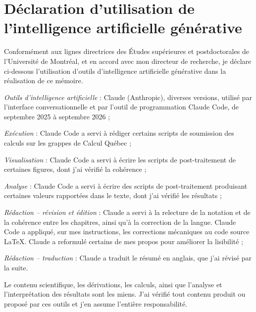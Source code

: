 \chapter{Déclaration d'utilisation de l'intelligence artificielle générative}
\label{chap:annexe-ia}

Conformément aux lignes directrices des Études supérieures et postdoctorales de l'Université de Montréal, et en accord avec mon directeur de recherche, je déclare ci-dessous l'utilisation d'outils d'intelligence artificielle générative dans la réalisation de ce mémoire.

\bigskip 

\textit{Outils d'intelligence artificielle} : Claude (Anthropic), diverses versions, utilisé par l'interface conversationnelle et par l'outil de programmation Claude Code, de septembre 2025 à septembre 2026 ;

\textit{Exécution} : Claude Code a servi à rédiger certains scripts de soumission des calculs sur les grappes de Calcul Québec ;

\textit{Visualisation} : Claude Code a servi à écrire les scripts de post-traitement de certaines figures, dont j'ai vérifié la cohérence ;

\textit{Analyse} : Claude Code a servi à écrire des scripts de post-traitement produisant certaines valeurs rapportées dans le texte, dont j'ai vérifié les résultats ;

\textit{Rédaction -- révision et édition} : Claude a servi à la relecture de la notation et de la cohérence entre les chapitres, ainsi qu'à la correction de la langue. Claude Code a appliqué, sur mes instructions, les corrections mécaniques au code source \LaTeX{}. Claude a reformulé certains de mes propos pour améliorer la lisibilité ;

\textit{Rédaction -- traduction} : Claude a traduit le résumé en anglais, que j'ai révisé par la suite.

\bigskip

Le contenu scientifique, les dérivations, les calculs, ainsi que l'analyse et l'interprétation des résultats sont les miens. J'ai vérifié tout contenu produit ou proposé par ces outils et j'en assume l'entière responsabilité.